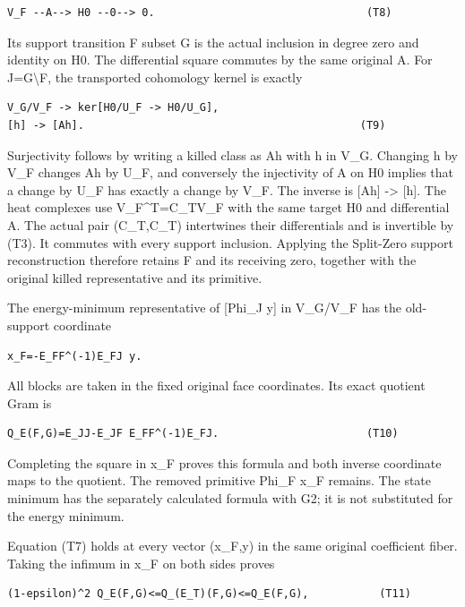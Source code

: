 \documentclass[11pt,a4paper]{article}
\renewcommand{\[}{\begingroup\small\originaldisplaystart}
\renewcommand{\]}{\originaldisplayend\endgroup}
\begin{document}
\begin{verbatim}
V_F --A--> H0 --0--> 0.                                 (T8)
\end{verbatim}

Its support transition F subset G is the actual inclusion in degree zero
and identity on H0. The differential square commutes by the same
original A. For J=G\textbackslash F, the transported cohomology kernel
is exactly

\begin{verbatim}
V_G/V_F -> ker[H0/U_F -> H0/U_G],
[h] -> [Ah].                                           (T9)
\end{verbatim}

Surjectivity follows by writing a killed class as Ah with h in V\_G.
Changing h by V\_F changes Ah by U\_F, and conversely the injectivity of
A on H0 implies that a change by U\_F has exactly a change by V\_F. The
inverse is {[}Ah{]} -\textgreater{} {[}h{]}. The heat complexes use
V\_F\^{}T=C\_TV\_F with the same target H0 and differential A. The
actual pair (C\_T,C\_T) intertwines their differentials and is
invertible by (T3). It commutes with every support inclusion. Applying
the Split-Zero support reconstruction therefore retains F and its
receiving zero, together with the original killed representative and its
primitive.

The energy-minimum representative of {[}Phi\_J y{]} in V\_G/V\_F has the
old-support coordinate

\begin{verbatim}
x_F=-E_FF^(-1)E_FJ y.
\end{verbatim}

All blocks are taken in the fixed original face coordinates. Its exact
quotient Gram is

\begin{verbatim}
Q_E(F,G)=E_JJ-E_JF E_FF^(-1)E_FJ.                       (T10)
\end{verbatim}

Completing the square in x\_F proves this formula and both inverse
coordinate maps to the quotient. The removed primitive Phi\_F x\_F
remains. The state minimum has the separately calculated formula with
G2; it is not substituted for the energy minimum.

Equation (T7) holds at every vector (x\_F,y) in the same original
coefficient fiber. Taking the infimum in x\_F on both sides proves

\begin{verbatim}
(1-epsilon)^2 Q_E(F,G)<=Q_(E_T)(F,G)<=Q_E(F,G),           (T11)
\end{verbatim}
\end{document}
